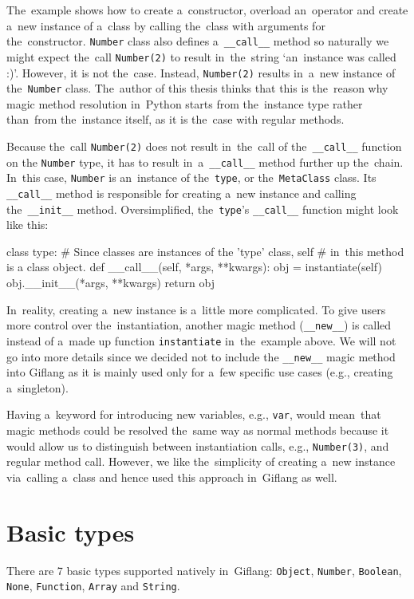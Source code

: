 The~example shows how to create a~constructor, overload an~operator and create a~new instance of a~class by calling the~class with arguments for the~constructor.
\texttt{Number} class also defines a~\texttt{\_\_call\_\_} method so naturally we might expect the~call \texttt{Number(2)} to result in~the~string
`an~instance was called :)'. However, it is not the~case. Instead, \texttt{Number(2)} results in~a~new instance of the~\texttt{Number} class. The~author of this
thesis thinks that this is the~reason why magic method resolution in~Python starts from the~instance type rather than~from the~instance itself, as it is
the~case with regular methods.

Because the~call \texttt{Number(2)} does not result in~the~call of the~\texttt{\_\_call\_\_} function on the
\texttt{Number} type, it has to result in~a~\texttt{\_\_call\_\_} method further up the~chain. In~this case, \texttt{Number} is an~instance of the~\texttt{type},
or the~\texttt{MetaClass} class. Its \texttt{\_\_call\_\_} method is responsible for creating a~new instance and calling the~\texttt{\_\_init\_\_} method. Oversimplified,
the~\texttt{type}'s \texttt{\_\_call\_\_} function might look like this:
\begin{code}
class type:
    # Since classes are instances of the 'type' class, self
    # in~this method is a class object. 
    def __call__(self, *args, **kwargs):
        obj = instantiate(self)
        obj.__init__(*args, **kwargs)
        return obj
\end{code}

In~reality, creating a~new instance is a~little more complicated. To give users more control over the~instantiation, another magic method (\texttt{\_\_new\_\_})
is called instead of a~made up function \texttt{instantiate} in~the~example above. We will not go into more details since we decided not to include the
\texttt{\_\_new\_\_} magic method into Giflang as it is mainly used only for a~few specific use cases (e.g., creating a~singleton).

Having a~keyword for introducing new variables, e.g., \texttt{var}, would mean~that magic methods could be resolved the~same way as normal methods because
it would allow us to distinguish between instantiation calls, e.g., \texttt{Number(3)}, and regular method call. However,
we like the~simplicity of creating a~new instance via~calling a~class and hence used this approach in~Giflang as well.

\section{Basic types}
There are 7 basic types supported natively in~Giflang: \texttt{Object}, \texttt{Number}, \texttt{Boolean}, \texttt{None}, \texttt{Function},
\texttt{Array} and \texttt{String}.

